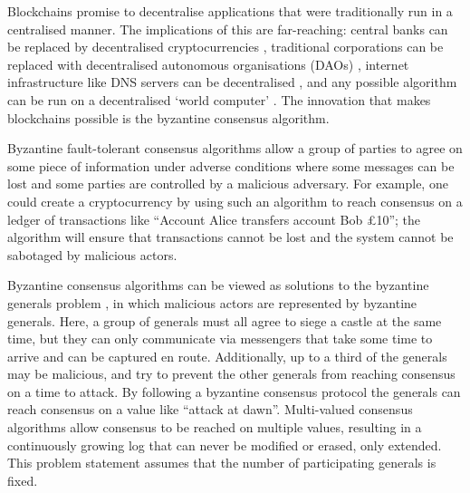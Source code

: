
Blockchains promise to decentralise applications that were traditionally run in a centralised manner. The implications of this are far-reaching: central banks can be replaced by decentralised cryptocurrencies \cite{nakamotoBitcoinPeertoPeerElectronic2008,perniceCryptocurrency2021}, traditional corporations can be replaced with decentralised autonomous organisations (DAOs) \cite{hassanDecentralizedAutonomousOrganization2021,ethereumWhite}, internet infrastructure like DNS servers can be decentralised \cite{EthereumNameService}, and any possible algorithm can be run on a decentralised `world computer' \cite{ethereumWhite,ethereumYellow}. The innovation that makes blockchains possible is the byzantine consensus algorithm.

Byzantine fault-tolerant consensus algorithms allow a group of parties to agree on some piece of information under adverse conditions where some messages can be lost and some parties are controlled by a malicious adversary. For example, one could create a cryptocurrency by using such an algorithm to reach consensus on a ledger of transactions like ``Account Alice transfers account Bob £10''; the algorithm will ensure that transactions cannot be lost and the system cannot be sabotaged by malicious actors.

Byzantine consensus algorithms can be viewed as solutions to the byzantine generals problem \cite{lamportByzantineGeneralsProblem1982}, in which malicious actors are represented by byzantine generals. Here, a group of generals must all agree to siege a castle at the same time, but they can only communicate via messengers that take some time to arrive and can be captured en route. Additionally, up to a third of the generals may be malicious, and try to prevent the other generals from reaching consensus on a time to attack. By following a byzantine consensus protocol the generals can reach consensus on a value like ``attack at dawn''. Multi-valued consensus algorithms allow consensus to be reached on multiple values, resulting in a continuously growing log that can never be modified or erased, only extended. This problem statement assumes that the number of participating generals is fixed.

